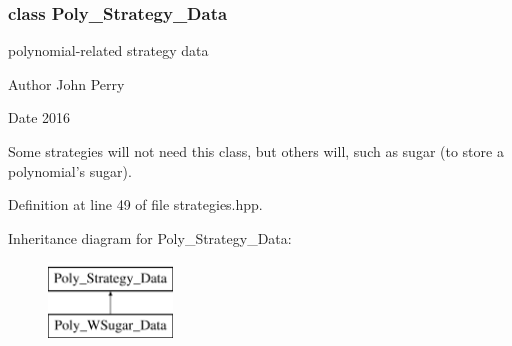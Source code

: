\subsubsection{class Poly\+\_\+\+Strategy\+\_\+\+Data}
polynomial-\/related strategy data 

\begin{DoxyAuthor}{Author}
John Perry 
\end{DoxyAuthor}
\begin{DoxyDate}{Date}
2016
\end{DoxyDate}
Some strategies will not need this class, but others will, such as sugar (to store a polynomial's sugar). 

Definition at line 49 of file strategies.\+hpp.

Inheritance diagram for Poly\+\_\+\+Strategy\+\_\+\+Data\+:\begin{figure}[H]
\begin{center}
\leavevmode
\includegraphics[height=2.000000cm]{group__strategygroup}
\end{center}
\end{figure}
